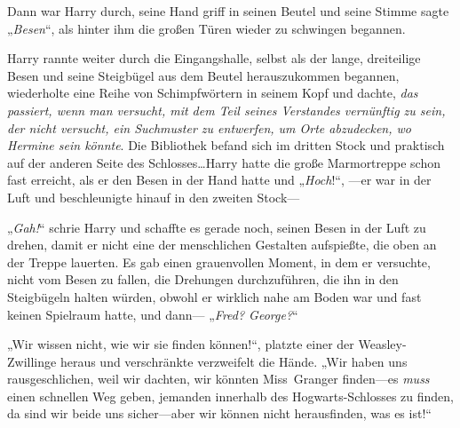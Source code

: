 Dann war Harry durch, seine Hand griff in seinen Beutel und seine Stimme sagte „\emph{Besen}“, als hinter ihm die großen Türen wieder zu schwingen begannen.

Harry rannte weiter durch die Eingangshalle, selbst als der lange, dreiteilige Besen und seine Steigbügel aus dem Beutel herauszukommen begannen, wiederholte eine Reihe von Schimpfwörtern in seinem Kopf und dachte, \emph{das passiert, wenn man versucht, mit dem Teil seines Verstandes vernünftig zu sein, der nicht versucht, ein Suchmuster zu entwerfen, um Orte abzudecken, wo Hermine sein könnte}. Die Bibliothek befand sich im dritten Stock und praktisch auf der anderen Seite des Schlosses…Harry hatte die große Marmortreppe schon fast erreicht, als er den Besen in der Hand hatte und „\emph{Hoch}!“, —er war in der Luft und beschleunigte hinauf in den zweiten Stock—

„\emph{Gah!}“ schrie Harry und schaffte es gerade noch, seinen Besen in der Luft zu drehen, damit er nicht eine der menschlichen Gestalten aufspießte, die oben an der Treppe lauerten. Es gab einen grauenvollen Moment, in dem er versuchte, nicht vom Besen zu fallen, die Drehungen durchzuführen, die ihn in den Steigbügeln halten würden, obwohl er wirklich nahe am Boden war und fast keinen Spielraum hatte, und dann— „\emph{Fred? George?}“

„Wir wissen nicht, wie wir sie finden können!“, platzte einer der Weasley-Zwillinge heraus und verschränkte verzweifelt die Hände.
„Wir haben uns rausgeschlichen, weil wir dachten, wir könnten Miss~Granger finden—es \emph{muss} einen schnellen Weg geben, jemanden innerhalb des Hogwarts-Schlosses zu finden, da sind wir beide uns sicher—aber wir können nicht herausfinden, was es ist!“

